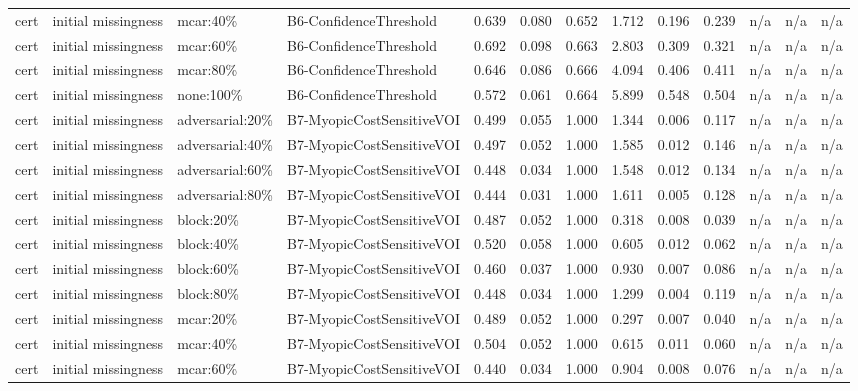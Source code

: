 \begin{table}[!ht]
{\begin{tabular}{lllllllllllll}
cert & initial missingness & mcar:40\% & B6-ConfidenceThreshold & 0.639 & 0.080 & 0.652 & 1.712 & 0.196 & 0.239 & n/a & n/a & n/a \\
cert & initial missingness & mcar:60\% & B6-ConfidenceThreshold & 0.692 & 0.098 & 0.663 & 2.803 & 0.309 & 0.321 & n/a & n/a & n/a \\
cert & initial missingness & mcar:80\% & B6-ConfidenceThreshold & 0.646 & 0.086 & 0.666 & 4.094 & 0.406 & 0.411 & n/a & n/a & n/a \\
cert & initial missingness & none:100\% & B6-ConfidenceThreshold & 0.572 & 0.061 & 0.664 & 5.899 & 0.548 & 0.504 & n/a & n/a & n/a \\
cert & initial missingness & adversarial:20\% & B7-MyopicCostSensitiveVOI & 0.499 & 0.055 & 1.000 & 1.344 & 0.006 & 0.117 & n/a & n/a & n/a \\
cert & initial missingness & adversarial:40\% & B7-MyopicCostSensitiveVOI & 0.497 & 0.052 & 1.000 & 1.585 & 0.012 & 0.146 & n/a & n/a & n/a \\
cert & initial missingness & adversarial:60\% & B7-MyopicCostSensitiveVOI & 0.448 & 0.034 & 1.000 & 1.548 & 0.012 & 0.134 & n/a & n/a & n/a \\
cert & initial missingness & adversarial:80\% & B7-MyopicCostSensitiveVOI & 0.444 & 0.031 & 1.000 & 1.611 & 0.005 & 0.128 & n/a & n/a & n/a \\
cert & initial missingness & block:20\% & B7-MyopicCostSensitiveVOI & 0.487 & 0.052 & 1.000 & 0.318 & 0.008 & 0.039 & n/a & n/a & n/a \\
cert & initial missingness & block:40\% & B7-MyopicCostSensitiveVOI & 0.520 & 0.058 & 1.000 & 0.605 & 0.012 & 0.062 & n/a & n/a & n/a \\
cert & initial missingness & block:60\% & B7-MyopicCostSensitiveVOI & 0.460 & 0.037 & 1.000 & 0.930 & 0.007 & 0.086 & n/a & n/a & n/a \\
cert & initial missingness & block:80\% & B7-MyopicCostSensitiveVOI & 0.448 & 0.034 & 1.000 & 1.299 & 0.004 & 0.119 & n/a & n/a & n/a \\
cert & initial missingness & mcar:20\% & B7-MyopicCostSensitiveVOI & 0.489 & 0.052 & 1.000 & 0.297 & 0.007 & 0.040 & n/a & n/a & n/a \\
cert & initial missingness & mcar:40\% & B7-MyopicCostSensitiveVOI & 0.504 & 0.052 & 1.000 & 0.615 & 0.011 & 0.060 & n/a & n/a & n/a \\
cert & initial missingness & mcar:60\% & B7-MyopicCostSensitiveVOI & 0.440 & 0.034 & 1.000 & 0.904 & 0.008 & 0.076 & n/a & n/a & n/a \\

\end{tabular}}
\end{table}
